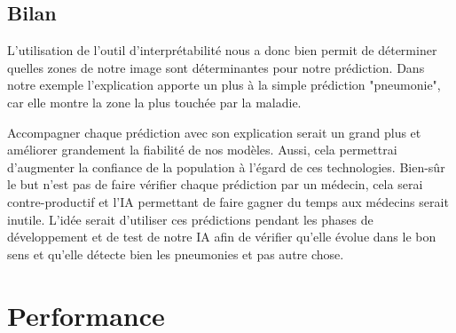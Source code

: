 \subsection{Bilan}
L'utilisation de l'outil d'interprétabilité nous a donc bien permit de déterminer quelles zones de notre image sont déterminantes pour notre prédiction. Dans notre exemple l'explication apporte un plus à la simple prédiction "pneumonie", car elle montre la zone la plus touchée par la maladie.\par
Accompagner chaque prédiction avec son explication serait un grand plus et améliorer grandement la fiabilité de nos modèles. Aussi, cela permettrai d'augmenter la confiance de la population à l'égard de ces technologies. Bien-sûr le but n'est pas de faire vérifier chaque prédiction par un médecin, cela serai contre-productif et l'IA permettant de faire gagner du temps aux médecins serait inutile. L'idée serait d'utiliser ces prédictions pendant les phases de développement et de test de notre IA afin de vérifier qu'elle évolue dans le bon sens et qu'elle détecte bien les pneumonies et pas autre chose.

\section{Performance}
